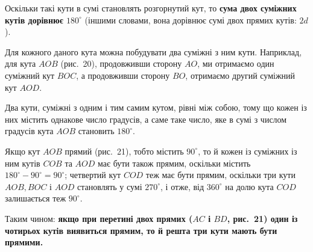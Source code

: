 Оскільки такі кути в сумі становлять розгорнутий кут, то \textbf{сума двох суміжних кутів дорівнює $180^\circ$} (іншими словами, вона дорівнює сумі двох прямих кутів: $2d$).

Для кожного даного кута можна побудувати два суміжні з ним кути. Наприклад, для кута $AOB$ (рис.~20), продовживши сторону $AO$, ми отримаємо один суміжний кут $BOC$, а продовживши сторону $BO$, отримаємо другий суміжний кут $AOD$. 

\begin{center}
\end{center}

Два кути, суміжні з одним і тим самим кутом, рівні між собою, тому що кожен із них містить однакове число градусів, а саме таке число, яке в сумі з числом градусів кута $AOB$ становить $180^\circ$.

Якщо кут $AOB$ прямий (рис.~21), тобто містить $90^\circ$, то й кожен із суміжних із ним кутів $COB$ та $AOD$ має бути також прямим, оскільки містить $180^\circ - 90^\circ = 90^\circ$; четвертий кут $COD$ теж має бути прямим, оскільки три кути $AOB, BOC$ і $AOD$ становлять у сумі $270^\circ$, і отже, від $360^\circ$ на долю кута $COD$ залишається теж $90^\circ$.

Таким чином: \textbf{якщо при перетині двох прямих ($AC$ і $BD$, рис.~21) один із чотирьох кутів виявиться прямим, то й решта три кути мають бути прямими.}

\begin{center}
\end{center}

